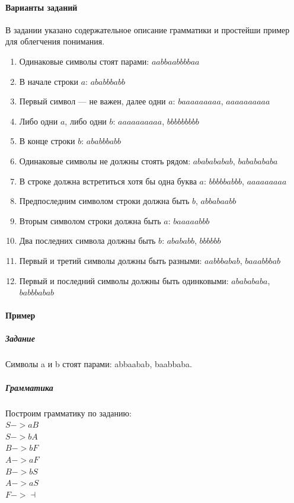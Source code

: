 \documentclass[a4paper,12pt]{article}
\begin{document}
\paragraph{Варианты заданий}
В задании указано содержательное описание грамматики и простейши пример для облегчения понимания.
\begin{enumerate}
	\item Одинаковые символы стоят парами: $aabbaabbbbaa$
	\item В начале строки $a$: $ababbbabb$
	\item Первый символ — не важен, далее одни $a$: $baaaaaaaaa$, $aaaaaaaaaa$
	\item Либо одни $a$, либо одни $b$: $aaaaaaaaaa$, $bbbbbbbbb$
	\item В конце строки $b$: $ababbbabb$
	\item Одинаковые символы не должны стоять рядом: $ababababab$, $bababababa$
	\item В строке должна встретиться хотя бы одна буква $a$: $bbbbbabbb$, $aaaaaaaaa$
	\item Предпоследним символом строки должна быть $b$, $abbabaabb$
	\item Вторым символом строки должна быть $a$: $baaaaabbb$
	\item Два последних символа должны быть $b$: $abababb$, $bbbbbb$
	\item Первый и третий символы должны быть разными: $aabbbabab$, $baaabbbab$
	\item Первый и последний символы должны быть одинковыми: $ababababa$, $babbbabab$
\end{enumerate}

\paragraph{Пример}
\subparagraph{Задание}
Символы a и b стоят парами: abbaabab, baabbaba.
\subparagraph{Грамматика}
Построим грамматику по заданию: \\
$S -> aB$\\
$S -> bA$\\
$B -> bF$\\
$A -> aF$\\
$B -> bS$\\
$A -> aS$\\
$F -> \dashv $
\end{document}

